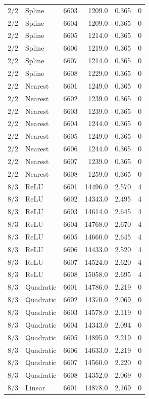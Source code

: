 \begin{longtable}{rlrrrr}
2/2 & Spline & 6603 & 1209.0 & 0.365 & 0 \\
2/2 & Spline & 6604 & 1209.0 & 0.365 & 0 \\
2/2 & Spline & 6605 & 1214.0 & 0.365 & 0 \\
2/2 & Spline & 6606 & 1219.0 & 0.365 & 0 \\
2/2 & Spline & 6607 & 1214.0 & 0.365 & 0 \\
2/2 & Spline & 6608 & 1229.0 & 0.365 & 0 \\
2/2 & Nearest & 6601 & 1249.0 & 0.365 & 0 \\
2/2 & Nearest & 6602 & 1239.0 & 0.365 & 0 \\
2/2 & Nearest & 6603 & 1239.0 & 0.365 & 0 \\
2/2 & Nearest & 6604 & 1244.0 & 0.365 & 0 \\
2/2 & Nearest & 6605 & 1249.0 & 0.365 & 0 \\
2/2 & Nearest & 6606 & 1244.0 & 0.365 & 0 \\
2/2 & Nearest & 6607 & 1239.0 & 0.365 & 0 \\
2/2 & Nearest & 6608 & 1259.0 & 0.365 & 0 \\
8/3 & ReLU & 6601 & 14496.0 & 2.570 & 4 \\
8/3 & ReLU & 6602 & 14343.0 & 2.495 & 4 \\
8/3 & ReLU & 6603 & 14614.0 & 2.645 & 4 \\
8/3 & ReLU & 6604 & 14768.0 & 2.670 & 4 \\
8/3 & ReLU & 6605 & 14660.0 & 2.645 & 4 \\
8/3 & ReLU & 6606 & 14433.0 & 2.520 & 4 \\
8/3 & ReLU & 6607 & 14524.0 & 2.620 & 4 \\
8/3 & ReLU & 6608 & 15058.0 & 2.695 & 4 \\
8/3 & Quadratic & 6601 & 14786.0 & 2.219 & 0 \\
8/3 & Quadratic & 6602 & 14370.0 & 2.069 & 0 \\
8/3 & Quadratic & 6603 & 14578.0 & 2.119 & 0 \\
8/3 & Quadratic & 6604 & 14343.0 & 2.094 & 0 \\
8/3 & Quadratic & 6605 & 14895.0 & 2.219 & 0 \\
8/3 & Quadratic & 6606 & 14633.0 & 2.219 & 0 \\
8/3 & Quadratic & 6607 & 14560.0 & 2.220 & 0 \\
8/3 & Quadratic & 6608 & 14352.0 & 2.069 & 0 \\
8/3 & Linear & 6601 & 14878.0 & 2.169 & 0 \\

\end{longtable}
